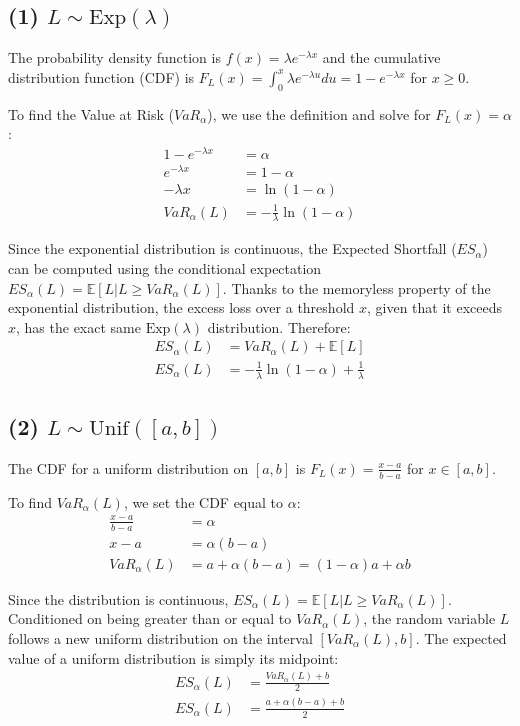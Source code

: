 \subsection*{(1) $L \sim \text{Exp}(\lambda)$}

The probability density function is $f(x) = \lambda e^{-\lambda x}$ and the cumulative distribution function (CDF) is $F_L(x) = \int_0^x \lambda e^{-\lambda u} du = 1 - e^{-\lambda x}$ for $x \ge 0$.

To find the Value at Risk ($VaR_{\alpha}$), we use the definition and solve for $F_L(x) = \alpha$:
\begin{align*}
1 - e^{-\lambda x} &= \alpha \\
e^{-\lambda x} &= 1 - \alpha \\
-\lambda x &= \ln(1 - \alpha) \\
VaR_{\alpha}(L) &= -\frac{1}{\lambda}\ln(1 - \alpha)
\end{align*}

Since the exponential distribution is continuous, the Expected Shortfall ($ES_{\alpha}$) can be computed using the conditional expectation $ES_{\alpha}(L) = \mathbb{E}[L | L \ge VaR_{\alpha}(L)]$. 
Thanks to the memoryless property of the exponential distribution, the excess loss over a threshold $x$, given that it exceeds $x$, has the exact same $\text{Exp}(\lambda)$ distribution. Therefore:
\begin{align*}
ES_{\alpha}(L) &= VaR_{\alpha}(L) + \mathbb{E}[L] \\
ES_{\alpha}(L) &= -\frac{1}{\lambda}\ln(1 - \alpha) + \frac{1}{\lambda}
\end{align*}

\subsection*{(2) $L \sim \text{Unif}([a,b])$}

The CDF for a uniform distribution on $[a,b]$ is $F_L(x) = \frac{x-a}{b-a}$ for $x \in [a,b]$.

To find $VaR_{\alpha}(L)$, we set the CDF equal to $\alpha$:
\begin{align*}
\frac{x-a}{b-a} &= \alpha \\
x - a &= \alpha(b-a) \\
VaR_{\alpha}(L) &= a + \alpha(b-a) = (1-\alpha)a + \alpha b
\end{align*}

Since the distribution is continuous, $ES_{\alpha}(L) = \mathbb{E}[L | L \ge VaR_{\alpha}(L)]$. 
Conditioned on being greater than or equal to $VaR_{\alpha}(L)$, the random variable $L$ follows a new uniform distribution on the interval $[VaR_{\alpha}(L), b]$. The expected value of a uniform distribution is simply its midpoint:
\begin{align*}
ES_{\alpha}(L) &= \frac{VaR_{\alpha}(L) + b}{2} \\
ES_{\alpha}(L) &= \frac{a + \alpha(b-a) + b}{2}
\end{align*}

